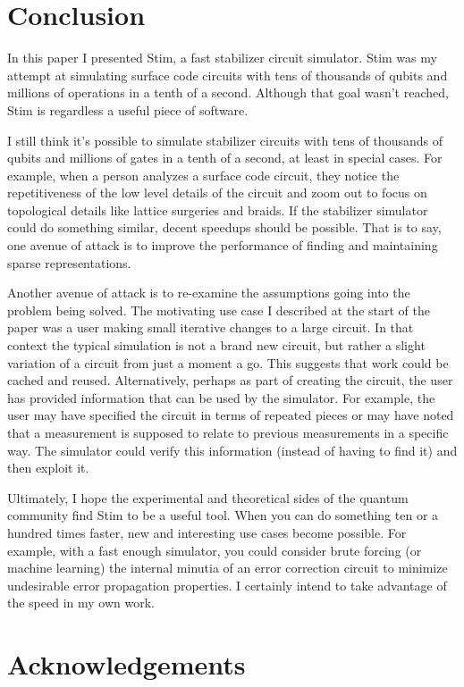 \documentclass[onecolumn,unpublished]{quantumarticle}
\theoremstyle{definition}
\theoremstyle{definition}
\theoremstyle{definition}
\begin{document}
\section{Conclusion}
\label{sec:conclusion}

In this paper I presented Stim, a fast stabilizer circuit simulator.
Stim was my attempt at simulating surface code circuits with tens of thousands of qubits and millions of operations in a tenth of a second.
Although that goal wasn't reached, Stim is regardless a useful piece of software.

I still think it's possible to simulate stabilizer circuits with tens of thousands of qubits and millions of gates in a tenth of a second, at least in special cases.
For example, when a person analyzes a surface code circuit, they notice the repetitiveness of the low level details of the circuit and zoom out to focus on topological details like lattice surgeries and braids.
If the stabilizer simulator could do something similar, decent speedups should be possible.
That is to say, one avenue of attack is to improve the performance of finding and maintaining sparse representations.

Another avenue of attack is to re-examine the assumptions going into the problem being solved.
The motivating use case I described at the start of the paper was a user making small iterative changes to a large circuit.
In that context the typical simulation is not a brand new circuit, but rather a slight variation of a circuit from just a moment a go.
This suggests that work could be cached and reused.
Alternatively, perhaps as part of creating the circuit, the user has provided information that can be used by the simulator.
For example, the user may have specified the circuit in terms of repeated pieces or may have noted that a measurement is supposed to relate to previous measurements in a specific way.
The simulator could verify this information (instead of having to find it) and then exploit it.

Ultimately, I hope the experimental and theoretical sides of the quantum community find Stim to be a useful tool.
When you can do something ten or a hundred times faster, new and interesting use cases become possible.
For example, with a fast enough simulator, you could consider brute forcing (or machine learning) the internal minutia of an error correction circuit to minimize undesirable error propagation properties.
I certainly intend to take advantage of the speed in my own work.


\section{Acknowledgements}
\end{document}
